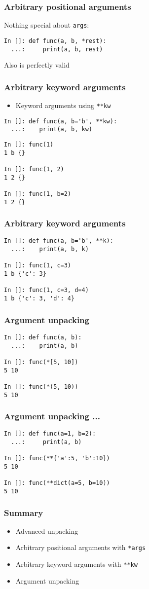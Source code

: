 \documentclass[14pt,compress,aspectratio=169]{beamer}
\begin{document}
\begin{frame}[fragile]
  \frametitle{Arbitrary positional arguments}

  Nothing special about \lstinline{args}:

\begin{lstlisting}
In []: def func(a, b, *rest):
  ...:     print(a, b, rest)

\end{lstlisting}
Also is perfectly valid
\end{frame}

\begin{frame}[fragile]
  \frametitle{Arbitrary keyword arguments}
  \vspace*{-0.1in}
  \begin{itemize}
  \item Keyword arguments using \lstinline{**kw}
  \end{itemize}
\begin{lstlisting}
In []: def func(a, b='b', **kw):
  ...:    print(a, b, kw)
\end{lstlisting}
  \pause
\begin{lstlisting}
In []: func(1)
1 b {}

In []: func(1, 2)
1 2 {}

In []: func(1, b=2)
1 2 {}
\end{lstlisting}
\end{frame}

\begin{frame}[fragile]
  \frametitle{Arbitrary keyword arguments}
\begin{lstlisting}
In []: def func(a, b='b', **k):
  ...:    print(a, b, k)

In []: func(1, c=3)
1 b {'c': 3}

In []: func(1, c=3, d=4)
1 b {'c': 3, 'd': 4}
\end{lstlisting}
\end{frame}


\begin{frame}[fragile]
  \frametitle{Argument unpacking}
\begin{lstlisting}
In []: def func(a, b):
  ...:    print(a, b)

In []: func(*[5, 10])
5 10

In []: func(*(5, 10))
5 10
\end{lstlisting}
\end{frame}

\begin{frame}[fragile]
  \frametitle{Argument unpacking ...}
\begin{lstlisting}
In []: def func(a=1, b=2):
  ...:     print(a, b)

In []: func(**{'a':5, 'b':10})
5 10

In []: func(**dict(a=5, b=10))
5 10
\end{lstlisting}
\end{frame}

\begin{frame}[fragile]
  \frametitle{Summary}
  \begin{itemize}
  \item Advanced unpacking
  \item Arbitrary positional arguments with \lstinline{*args}
  \item Arbitrary keyword arguments with \lstinline{**kw}
  \item Argument unpacking
  \end{itemize}
\end{frame}
\end{document}
